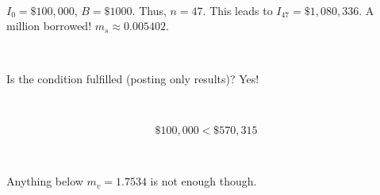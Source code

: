 \documentclass{article}
\begin{document}
\

$I_0 = \$100,000$, $B = \$1000$. Thus, $n = 47$. This leads to $I_{47} = \$1,080,336$. A million borrowed! $m_s \approx 0.005402$.

\

Is the condition fulfilled (posting only results)? Yes!

\

\begin{equation}
\$100,000 < \$570,315
\end{equation}

\

Anything below $m_v = 1.7534$ is not enough though.
\end{document}
